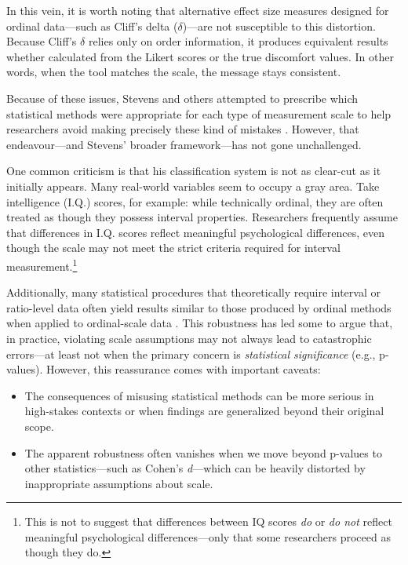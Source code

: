 \vspace{2em}

In this vein, it is worth noting that alternative effect size measures designed for ordinal data—such as Cliff’s delta ($\delta$)—are not susceptible to this distortion. Because Cliff’s $\delta$ relies only on order information, it produces equivalent results whether calculated from the Likert scores or the true discomfort values. In other words, when the tool matches the scale, the message stays consistent.

Because of these issues, Stevens and others attempted to prescribe which statistical methods were appropriate for each type of measurement scale to help researchers avoid making precisely these kind of mistakes \parencite{Robinson1965, Senders1958, Stevens1946}. However, that endeavour—and Stevens’ broader framework—has not gone unchallenged.

One common criticism is that his classification system is not as clear-cut as it initially appears. Many real-world variables seem to occupy a gray area. Take intelligence (I.Q.) scores, for example: while technically ordinal, they are often treated as though they possess interval properties. Researchers frequently assume that differences in I.Q. scores reflect meaningful psychological differences, even though the scale may not meet the strict criteria required for interval measurement.\footnote{This is not to suggest that differences between IQ scores \textit{do} or \textit{do not} reflect meaningful psychological differences—only that some researchers proceed as though they do.} 

Additionally, many statistical procedures that theoretically require interval or ratio-level data often yield results similar to those produced by ordinal methods when applied to ordinal-scale data \parencite{Baker1966}. This robustness has led some to argue that, in practice, violating scale assumptions may not always lead to catastrophic errors—at least not when the primary concern is \textit{statistical significance} (e.g., p-values). However, this reassurance comes with important caveats:

\begin{itemize}
    \item The consequences of misusing statistical methods can be more serious in high-stakes contexts or when findings are generalized beyond their original scope.
    \item The apparent robustness often vanishes when we move beyond p-values to other statistics—such as Cohen’s \textit{d}—which can be heavily distorted by inappropriate assumptions about scale.
\end{itemize}

